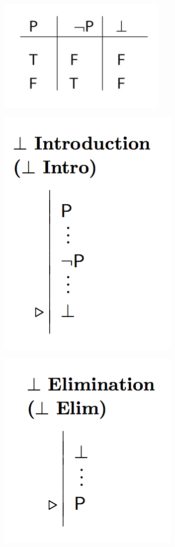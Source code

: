 \documentclass[12pt]{extarticle}
\begin{document}
\begin{multicols*}{3}
\begin{center}
\includegraphics[scale=0.3]{img/tt_contradiction.png}
\end{center}
\begin{center}
\includegraphics[scale=0.3]{img/rule_contradiction_intro.png}
\end{center}
\begin{center}
\includegraphics[scale=0.3]{img/rule_contradiction_elim.png}
\end{center}
 

\end{multicols*}
\end{document}
